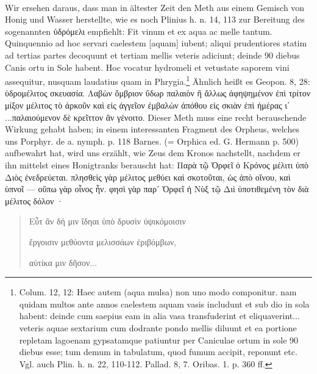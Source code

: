 \documentclass[a4paper, 11pt, oneside]{article}
\begin{document}
\paragraph{}
Wir ersehen daraus, dass man in ältester Zeit den Meth aus einem Gemisch von Honig und Wasser herstellte, wie es noch Plinius h. n. 14, 113 zur Bereitung des sogenannten ὑδρόμελι empfiehlt: Fit vinum et ex aqua ac melle tantum. Quinquennio ad hoc servari caelestem [aquam] iubent; aliqui prudentiores statim ad tertias partes decoquunt et tertiam mellis veteris adiciunt; deinde 90 diebus Canis ortu in Sole habent. Hoc vocatur hydromeli et vetustate saporem vini assequitur, nusquam laudatius quam in Phrygia.\footnote{Colum. 12, 12: Haec autem (aqua mulsa) non uno modo componitur. nam quidam multos ante annos caelestem aquam vasis includunt et sub dio in sola habent: deinde cum saepius eam in alia vasa transfuderint et eliquaverint... veteris aquae sextarium cum dodrante pondo mellis diluunt et ea portione repletam lagoenam gypsatamque patiuntur per Caniculae ortum in sole 90 diebus esse; tum demum in tabulatum, quod fumum accipit, reponunt etc. Vgl. auch Plin. h. n. 22, 110-112. Pallad. 8, 7. Oribas. 1. p. 360 ff.} Ähnlich heißt es Geopon. 8, 28: ὑδρομέλιτος σκευασία. Λαβὼν ὄμβριον ὕδωρ παλαιὸν ἢ ἄλλως ἀφηψημένον ἐπὶ τρίτον μίξον μέλιτος τὸ ἀρκοῦν καὶ εἰς ἀγγεῖον ἐμβαλὼν ἀπόθου εἰς σκιὰν ἐπὶ ἡμέρας ι΄ ...παλαιούμενον δὲ κρεῖττον ἂν γένοιτο. Dieser Meth muss eine recht berauschende Wirkung gehabt haben; in einem interessanten Fragment des Orpheus, welches uns Porphyr. de a. nymph. p. 118 Barnes. (= Orphica ed. G. Hermann p. 500) aufbewahrt hat, wird uns erzählt, wie Zeus dem Kronos nachstellt, nachdem er ihn mittelst eines Honigtranks berauscht hat: Παρὰ τῷ Ὀρφεῖ ὁ Κρόνος μέλιτι ὑπὸ Διὸς ἐνεδρεύεται. πλησθεὶς γὰρ μέλιτος μεθύει καὶ σκοτοῦται, ὡς ἀπὸ οἴνου, καὶ ὑπνοῖ --- οὕπω γὰρ οἷνος ἦν. φησὶ γὰρ παρ᾽ Ὀρφεῖ ἡ Νὺξ τῷ Διὶ ὑποτιθεμένη τὸν διὰ μέλιτος δόλον ·
\begin{quotation}\large
Εὖτ ἂν δή μιν ἴδηαι ὑπὸ δρυσὶν ὑψικόμοισιν

ἔργοισιν μεθύοντα μελισσάων ἐριβόμβων,

αὐτίκα μιν δῆσον...
\end{quotation}
\end{document}
